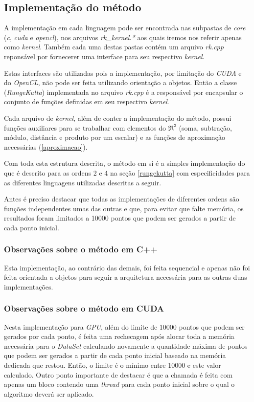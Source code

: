   \subsection{Implementação do método}
  A implementação em cada linguagem pode ser encontrada nas subpastas de \textit{core} (\textit{c}, \textit{cuda} e \textit{opencl}), nos arquivos \textit{rk\_kernel.*} aos quais iremos nos referir apenas como \textit{kernel}. Também cada uma destas pastas contém um arquivo \textit{rk.cpp} reponsável por fornecerer uma interface para seu respectivo \textit{kernel}.
  
  Estas interfaces são utilizadas pois a implementação, por limitação do \textit{CUDA} e do \textit{OpenCL}, não pode ser feita utilizando orientação a objetos. Então a classe (\textit{RungeKutta}) implementada no arquivo \textit{rk.cpp} é a responsável por encapsular o conjunto de funções definidas em seu respectivo \textit{kernel}.

  Cada arquivo de \textit{kernel}, além de conter a implementação do método, possui funções auxiliares para se trabalhar com elementos do $\Re ^{3}$ (soma, subtração, módulo, distância e produto por um escalar) e as funções de aproximação necessárias (\ref{aproximacao}).
  
  Com toda esta estrutura descrita, o método em si é a simples implementação do que é descrito para as ordens 2 e 4 na seção \ref{rungekutta} com especificidades para as diferentes linguagens utilizadas descritas a seguir.
  
  Antes é preciso destacar que todas as implementações de diferentes ordens são funções independentes umas das outras e que, para evitar que falte memória, os resultados foram limitados a 10000 pontos que podem ser gerados a partir de cada ponto inicial.
  
    \subsubsection{Observações sobre o método em C++}
    Esta implementação, ao contrário das demais, foi feita sequencial e apenas não foi feita orientada a objetos para seguir a arquitetura necessária para as outras duas implementações.
    
    \subsubsection{Observações sobre o método em CUDA}
    Nesta implementação para \textit{GPU}, além do limite de 10000 pontos que podem ser gerados por cada ponto, é feita uma rechecagem após alocar toda a memória necessária para o \textit{DataSet} calculando novamente a quantidade máxima de pontos que podem ser gerados a partir de cada ponto inicial baseado na memória dedicada que restou. Então, o limite é o mínimo entre 10000 e este valor calculado.
    Outro ponto importante de destacar é que a chamada é feita com apenas um bloco contendo uma \textit{thread} para cada ponto inicial sobre o qual o algoritmo deverá ser aplicado.
    
